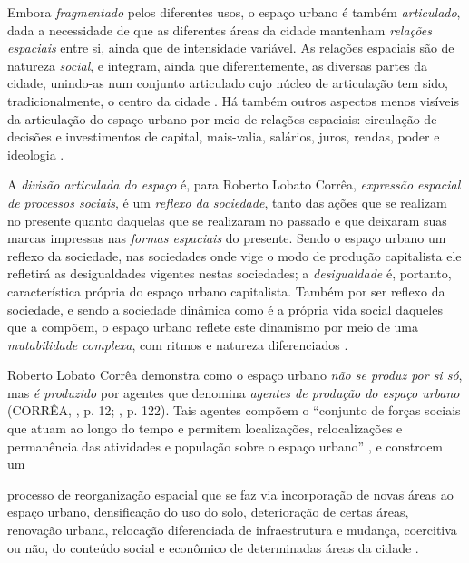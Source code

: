 Embora \textit{fragmentado} pelos diferentes usos, o espaço urbano é também \textit{articulado}, dada a necessidade de que as diferentes áreas da cidade mantenham \textit{relações espaciais} entre si, ainda que de intensidade variável. As relações espaciais são de natureza \textit{social}, e integram, ainda que diferentemente, as diversas partes da cidade, unindo-as num conjunto articulado cujo núcleo de articulação tem sido, tradicionalmente, o centro da cidade \cite[p.~7-8]{CORREA1985espa}. Há também outros aspectos menos visíveis da articulação do espaço urbano por meio de relações espaciais: circulação de decisões e investimentos de capital, mais-valia, salários, juros, rendas, poder e ideologia \cite[p.~147]{CORREA1997}. 

A \textit{divisão articulada do espaço} é, para Roberto Lobato Corrêa, \textit{expressão espacial de processos sociais}, é um \textit{reflexo da sociedade}, tanto das ações que se realizam no presente quanto daquelas que se realizaram no passado e que deixaram suas marcas impressas nas \textit{formas espaciais} do presente. Sendo o espaço urbano um reflexo da sociedade, nas sociedades onde vige o modo de produção capitalista ele refletirá as desigualdades vigentes nestas sociedades; a \textit{desigualdade} é, portanto, característica própria do espaço urbano capitalista. Também por ser reflexo da sociedade, e sendo a sociedade dinâmica como é a própria vida social daqueles que a compõem, o espaço urbano reflete este dinamismo por meio de uma \textit{mutabilidade complexa}, com ritmos e natureza diferenciados \cite[p.~8]{CORREA1985espa}.

Roberto Lobato Corrêa demonstra como o espaço urbano \textit{não se produz por si só}, mas \textit{é produzido} por agentes que denomina \textit{agentes de produção do espaço urbano} (CORRÊA, \citeyear{CORREA1985espa}, p. 12; \citeyear{CORREA1997}, p. 122). Tais agentes compõem o ``conjunto de forças sociais que atuam ao longo do tempo e permitem localizações, relocalizações e permanência das atividades e população sobre o espaço urbano'' \cite[p.~122]{CORREA1997}, e constroem um

\begin{citacao}
processo de reorganização espacial que se faz via incorporação de novas áreas ao espaço urbano, densificação do uso do solo, deterioração de certas áreas, renovação urbana, relocação diferenciada de infraestrutura e mudança, coercitiva ou não, do conteúdo social e econômico de determinadas áreas da cidade \cite[p.~11]{CORREA1985espa}.
\end{citacao}

